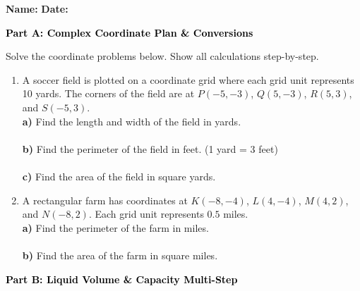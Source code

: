 \documentclass[12pt, letterpaper, fleqn]{article}
\newcommand{\blanklong}{\underline{\hspace{6.5cm}}}
\begin{document}
\textbf{Name:} \underline{\hspace{5cm}}
\hfill
\textbf{Date:} \underline{\hspace{3cm}}\\

\begin{tcolorbox}[colback=black!10]
    \large\textcolor{black}{\textbf{Part A: Complex Coordinate Plan \& Conversions}}
\end{tcolorbox}

\vspace{3mm}

\noindent
Solve the coordinate problems below. Show all calculations step-by-step.

\vspace{5mm}

\begin{enumerate}[itemsep=2.2cm, leftmargin=0.6cm]
\item A soccer field is plotted on a coordinate grid where each grid unit represents 10 yards. The corners of the field are at $P(-5, -3)$, $Q(5, -3)$, $R(5, 3)$, and $S(-5, 3)$. \\
\textbf{a)} Find the length and width of the field in yards. \\
\blanklong \\
\textbf{b)} Find the perimeter of the field in feet. (1 yard = 3 feet) \\
\blanklong \\
\textbf{c)} Find the area of the field in square yards. \\
\blanklong

\item A rectangular farm has coordinates at $K(-8, -4)$, $L(4, -4)$, $M(4, 2)$, and $N(-8, 2)$. Each grid unit represents $0.5$ miles. \\
\textbf{a)} Find the perimeter of the farm in miles. \\
\blanklong \\
\textbf{b)} Find the area of the farm in square miles. \\
\blanklong
\end{enumerate}

\newpage

\begin{tcolorbox}[colback=black!10]
    \large\textcolor{black}{\textbf{Part B: Liquid Volume \& Capacity Multi-Step}}
\end{tcolorbox}
\end{document}
